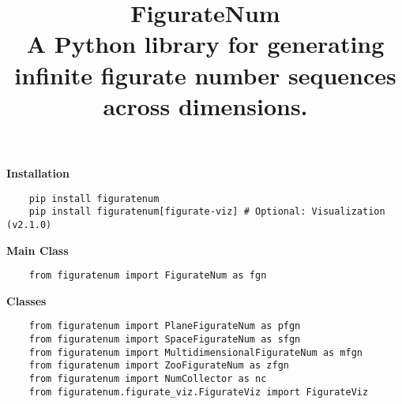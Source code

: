 \documentclass{article}
\title{\huge \textbf{FigurateNum} \\
   \Large  A Python library for generating infinite figurate number sequences across dimensions.}
\author{}
\date{}
\begin{document}
\begin{tcolorbox}[leftrule=1mm, rightrule=1mm, toprule=1mm, bottomrule=1mm ]
    \maketitle
    \vspace{-5em}
    \begin{multicols}{2}

        \begin{tcolorbox}[leftrule=2mm, rightrule=0mm, toprule=0mm, bottomrule=0mm,  colframe=SpringGreen4, colback=SpringGreen4!12, height=2cm]
            \textbf{\large Installation}
            \begin{lstlisting}
    pip install figuratenum
    pip install figuratenum[figurate-viz] # Optional: Visualization (v2.1.0)
            \end{lstlisting}
        \end{tcolorbox}

        \begin{tcolorbox}[leftrule=2mm, rightrule=0mm, toprule=0mm, bottomrule=0mm,  colframe=SpringGreen4, colback=SpringGreen4!12, height=1.7cm]
            \textbf{\large Main Class}
            \begin{lstlisting}
    from figuratenum import FigurateNum as fgn
             \end{lstlisting}
        \end{tcolorbox}

        \begin{tcolorbox}[leftrule=2mm, rightrule=0mm, toprule=0mm, bottomrule=0mm,  colframe=SpringGreen4, colback=SpringGreen4!12, height=3.6cm]
            \textbf{\large Classes}
            \begin{lstlisting}
    from figuratenum import PlaneFigurateNum as pfgn
    from figuratenum import SpaceFigurateNum as sfgn
    from figuratenum import MultidimensionalFigurateNum as mfgn
    from figuratenum import ZooFigurateNum as zfgn
    from figuratenum import NumCollector as nc
    from figuratenum.figurate_viz.FigurateViz import FigurateViz
             \end{lstlisting}
        \end{tcolorbox}

    \end{multicols}
\end{tcolorbox}

\thispagestyle{fancy}
\end{document}
